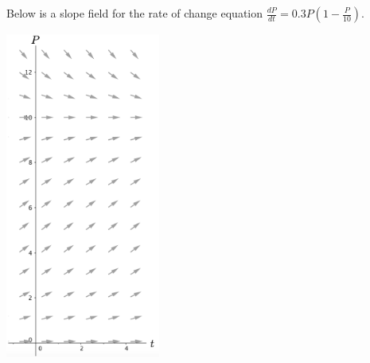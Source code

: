 Below is a slope field for the rate of change equation $\displaystyle \frac{dP}{dt}=0.3P\left(1-\frac{P}{10}\right).$ 
\begin{center}
\includegraphics[width=2in]{03/03SlopeFieldFish.png}
\end{center}
 
